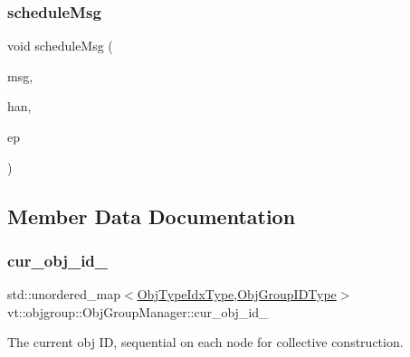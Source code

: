 \subsubsection{\texorpdfstring{schedule\+Msg}{scheduleMsg}}
{\footnotesize\ttfamily void schedule\+Msg (\begin{DoxyParamCaption}\item[{\hyperlink{namespacevt_ab2b3d506ec8e8d1540aede826d84a239}{Msg\+Shared\+Ptr}$<$ \hyperlink{namespacevt_a1125ac1da6c0bbf141e0ea0739d7602d}{Short\+Message} $>$}]{msg,  }\item[{\hyperlink{namespacevt_af64846b57dfcaf104da3ef6967917573}{Handler\+Type}}]{han,  }\item[{\hyperlink{namespacevt_a985a5adf291c34a3ca263b3378388236}{Epoch\+Type}}]{ep }\end{DoxyParamCaption})\hspace{0.3cm}{\ttfamily [friend]}}



\subsection{Member Data Documentation}
\mbox{\label{structvt_1_1objgroup_1_1_obj_group_manager_a0e99df8712ce2d9e21404955ec312cf8}} 
\subsubsection{\texorpdfstring{cur\+\_\+obj\+\_\+id\+\_\+}{cur\_obj\_id\_}}
{\footnotesize\ttfamily std\+::unordered\+\_\+map$<$\hyperlink{namespacevt_1_1objgroup_a378e4b966221779c74f3a2f921eb2421}{Obj\+Type\+Idx\+Type},\hyperlink{namespacevt_1_1objgroup_a54a50ff6833bf618e5bedb9a3b6d0e07}{Obj\+Group\+I\+D\+Type}$>$ vt\+::objgroup\+::\+Obj\+Group\+Manager\+::cur\+\_\+obj\+\_\+id\+\_\+\hspace{0.3cm}{\ttfamily [private]}}



The current obj ID, sequential on each node for collective construction. 

\mbox{\label{structvt_1_1objgroup_1_1_obj_group_manager_aee25f043f12ed4447af6974acc5aa4cf}} 
